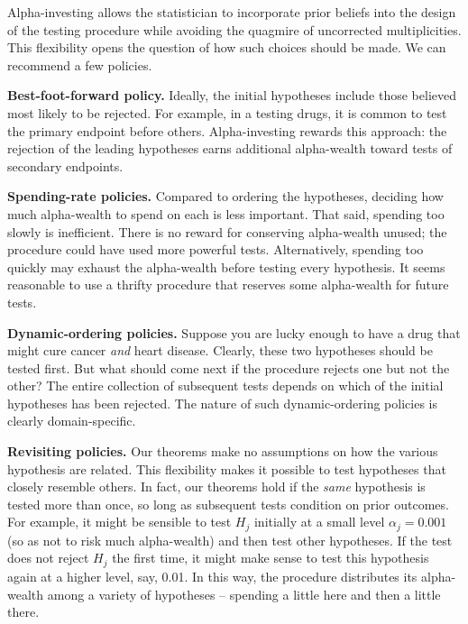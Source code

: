 \documentclass[12pt]{article}
\begin{document}
Alpha-investing allows the statistician to incorporate prior beliefs
 into the design of the testing procedure while avoiding
 the quagmire of uncorrected multiplicities.  This flexibility
 opens the question of how such choices should be made.
 We can recommend a few policies.  

\begin{description}
\item{\bf Best-foot-forward policy.}
 Ideally, the initial hypotheses include those believed most likely to be
 rejected.  For example, in a testing drugs, it is common to
 test the primary endpoint before others. Alpha-investing rewards this approach: 
 the rejection of the leading hypotheses earns additional alpha-wealth toward tests 
 of secondary endpoints.
 
\item{\bf Spending-rate policies.} Compared to ordering the 
 hypotheses, deciding how much alpha-wealth to spend on each is 
 less important. That said, spending too slowly is inefficient.  
 There is no reward for conserving alpha-wealth unused; the procedure 
 could have used more powerful tests. Alternatively, spending too quickly  may 
 exhaust the alpha-wealth before testing every hypothesis.  It seems reasonable 
 to use a thrifty procedure that reserves some alpha-wealth for future tests.  

\item{\bf Dynamic-ordering policies.} Suppose you are lucky enough to have a
 drug that might cure cancer {\em and} heart disease.  Clearly, these two
 hypotheses should be tested first.  But what should come next
 if the procedure rejects one but not the other? The entire collection of subsequent tests depends on which of the initial hypotheses has been rejected.  The nature of such dynamic-ordering policies is clearly domain-specific. 

\item{\bf Revisiting policies.} Our theorems make no assumptions on how 
 the various hypothesis are related.  This flexibility makes it possible to test  
 hypotheses that closely resemble others.  In fact, our theorems
 hold if the {\em same} hypothesis is tested more than once, so long as
 subsequent tests  condition on prior outcomes.  
 For example, it might be sensible to test $H_{j}$
 initially at a small level $\alpha_{j} = 0.001$ (so as not to risk much alpha-wealth) 
 and then test other hypotheses. If the test does not
 reject $H_j$ the first time, it might make sense to test this hypothesis
 again at a higher level, say, 0.01.  In this way, the procedure distributes
  its alpha-wealth among a variety of
 hypotheses -- spending a little here and then a little there. 
\end{description}
\end{document}
